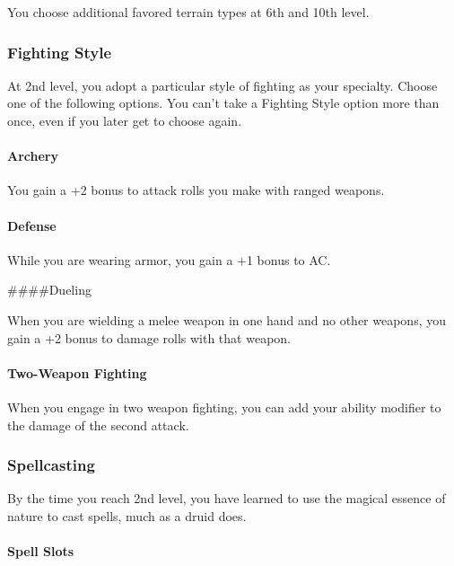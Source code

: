 \documentclass[
]{article}
\begin{document}
You choose additional favored terrain types at 6th and 10th level.

\hypertarget{fighting-style}{%
\subsubsection{Fighting Style}\label{fighting-style}}

At 2nd level, you adopt a particular style of fighting as your
specialty. Choose one of the following options. You can't take a
Fighting Style option more than once, even if you later get to choose
again.

\hypertarget{archery}{%
\paragraph{Archery}\label{archery}}

You gain a +2 bonus to attack rolls you make with ranged weapons.

\hypertarget{defense}{%
\paragraph{Defense}\label{defense}}

While you are wearing armor, you gain a +1 bonus to AC.

\#\#\#\#Dueling

When you are wielding a melee weapon in one hand and no other weapons,
you gain a +2 bonus to damage rolls with that weapon.

\hypertarget{two-weapon-fighting}{%
\paragraph{Two-Weapon Fighting}\label{two-weapon-fighting}}

When you engage in two weapon fighting, you can add your ability
modifier to the damage of the second attack.

\hypertarget{spellcasting}{%
\subsubsection{Spellcasting}\label{spellcasting}}

By the time you reach 2nd level, you have learned to use the magical
essence of nature to cast spells, much as a druid does.

\hypertarget{spell-slots}{%
\paragraph{Spell Slots}\label{spell-slots}}
\end{document}
